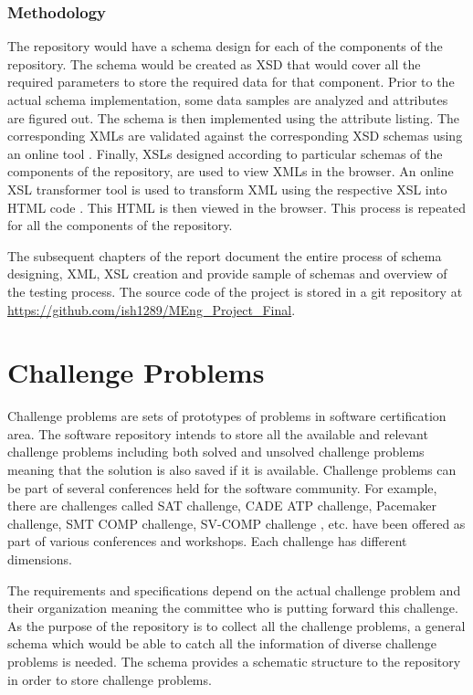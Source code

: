\documentclass[11pt,letterpaper]{report}
\begin{document}
\subsection{Methodology}
The repository would have a schema design for each of the components of the repository. The schema would be created as XSD that would cover all the required parameters to store the required data for that component. Prior to the actual schema implementation, some data samples are analyzed and attributes are figured out. The schema is then implemented using the attribute listing. The corresponding XMLs are validated against the corresponding XSD schemas using an online tool \cite{olXSD}. Finally, XSLs designed according to particular schemas of the components of the repository, are used to view XMLs in the browser. An online XSL transformer tool is used to transform XML using the respective XSL into HTML code \cite{olXSL}. This HTML is then viewed in the browser. This process is repeated for all the components of the repository. 

\bigskip
The subsequent chapters of the report document the entire process of schema designing, XML, XSL creation and provide sample of schemas and overview of the testing process. The source code of the project is stored in a git repository at \url{https://github.com/ish1289/MEng_Project_Final}.

\chapter{Challenge Problems}

Challenge problems are sets of prototypes of problems in software certification area. The software repository intends to store all the available and relevant challenge problems including both solved and unsolved challenge problems meaning that the solution is also saved if it is available. Challenge problems can be part of several conferences held for the software community. For example, there are challenges called SAT challenge, CADE ATP  challenge, Pacemaker challenge, SMT COMP challenge, SV-COMP challenge \cite{SAT,CADE,Pacemaker,SMT,SV}, etc. have been offered as part of various conferences and workshops. Each challenge has different dimensions. 

The requirements and specifications depend on the actual challenge problem and their organization meaning the committee who is putting forward this challenge. As the purpose of the repository is to collect all the challenge problems, a general schema which would be able to catch all the information of diverse challenge problems is needed. The schema provides a schematic structure to the repository in order to store challenge problems.  
\end{document}
